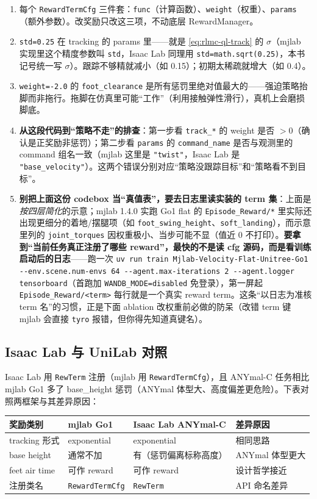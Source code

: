 \begin{enumerate}
\item 每个 \verb|RewardTermCfg| 三件套：\verb|func|（计算函数）、\verb|weight|（权重）、\verb|params|（额外参数）。改奖励只改这三项，不动底层 RewardManager。
\item \verb|std=0.25| 在 tracking 的 params 里——就是 \eqref{eq:rlmc-ql-track} 的 $\sigma$（mjlab 实现里这个精度参数叫 \verb|std|，Isaac Lab 同理用 \verb|std=math.sqrt(0.25)|，本书记号统一写 $\sigma$）。跟踪不够精就减小（如 0.15）；初期太稀疏就增大（如 0.4）。
\item \verb|weight=-2.0| 的 \verb|foot_clearance| 是所有惩罚里绝对值最大的——强迫策略抬脚而非拖行。拖脚在仿真里可能“工作”（利用接触弹性滑行），真机上会磨损脚底。
\item \textbf{从这段代码到“策略不走”的排查}：第一步看 \verb|track_*| 的 weight 是否 $>0$（确认是正奖励非惩罚）；第二步看 \verb|params| 的 \verb|command_name| 是否与观测里的 command 组名一致（mjlab 这里是 \verb|"twist"|，Isaac Lab 是 \verb|"base_velocity"|）。这两个错误分别对应“策略没跟踪目标”和“策略看不到目标”。
\item \textbf{别把上面这份 codebox 当“真值表”，要去日志里读实装的 term 集}：上面是\emph{按四层简化}的示意；mjlab 1.4.0 实跑 Go1 flat 的 \verb|Episode_Reward/*| 里实际还出现更细分的着地/摆腿项（如 \verb|foot_swing_height|、\verb|soft_landing|），而示意里列的 \verb|joint_torques| 因权重极小、当步可能不显（值近 0 不打印）。\textbf{要拿到“当前任务真正注册了哪些 reward”，最快的不是读 cfg 源码，而是看训练启动后的日志}——跑一次 \verb|uv run train Mjlab-Velocity-Flat-Unitree-Go1 --env.scene.num-envs 64 --agent.max-iterations 2 --agent.logger tensorboard|（首跑加 \verb|WANDB_MODE=disabled| 免登录），第一屏起 \verb|Episode_Reward/<term>| 每行就是一个真实 reward term。这条“以日志为准核 term 名”的习惯，正是下面 ablation 改权重前必做的防呆（改错 term 键 mjlab 会直接 \verb|tyro| 报错，但你得先知道真键名）。
\end{enumerate}

\subsection{Isaac Lab 与 UniLab 对照}
\label{sec:rlmc-ql-reward-isaac}

Isaac Lab 用 \verb|RewTerm| 注册（mjlab 用 \verb|RewardTermCfg|），且 ANYmal-C 任务相比 mjlab Go1 多了 base\_height 惩罚（ANYmal 体型大、高度偏差更危险）。下表对照两框架与其差异原因：

\begin{center}
\small
\begin{tabular}{@{}llll@{}}
\toprule
奖励类别 & mjlab Go1 & Isaac Lab ANYmal-C & 差异原因 \\
\midrule
tracking 形式 & exponential & exponential & 相同思路 \\
base height & 通常不加 & 有（惩罚偏离标称高度） & ANYmal 体型更大 \\
feet air time & 可作 reward & 可作 reward & 设计哲学接近 \\
注册类名 & \verb|RewardTermCfg| & \verb|RewTerm| & API 命名差异 \\
\bottomrule
\end{tabular}
\end{center}

